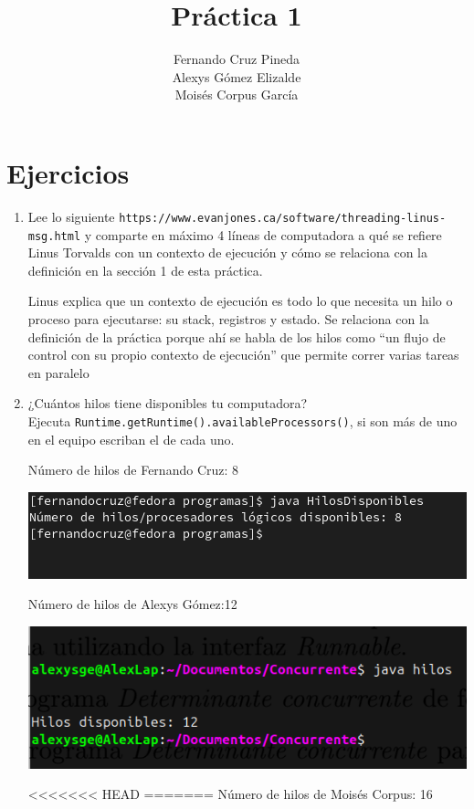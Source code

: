 \documentclass[12pt]{article}
\title{Práctica 1}
\author{Fernando Cruz Pineda \\ Alexys Gómez Elizalde \\ Moisés Corpus García}
\date{}
\begin{document}
\maketitle

\section*{Ejercicios}

\begin{enumerate}
    \item Lee lo siguiente \texttt{https://www.evanjones.ca/software/threading-linus-msg.html} y comparte en máximo 4 líneas de computadora a qué se refiere Linus Torvalds con un contexto de ejecución y cómo se relaciona con la definición en la sección 1 de esta práctica.

    Linus explica que un contexto de ejecución es todo lo que necesita un hilo o proceso para ejecutarse: su stack, registros y estado. Se relaciona con la definición de la práctica porque ahí se habla de los hilos como “un flujo de control con su propio contexto de ejecución” que permite correr varias tareas en paralelo
    
    \item ¿Cuántos hilos tiene disponibles tu computadora? \\
      Ejecuta \texttt{Runtime.getRuntime().availableProcessors()}, si son más de uno en el equipo escriban el de cada uno.

      Número de hilos de Fernando Cruz: 8

      \includegraphics[]{Fer.png}

      Número de hilos de Alexys Gómez:12

      \includegraphics[]{1Alexys.png}

<<<<<<< HEAD
=======
      Número de hilos de Moisés Corpus: 16


\end{enumerate}
\end{document}
